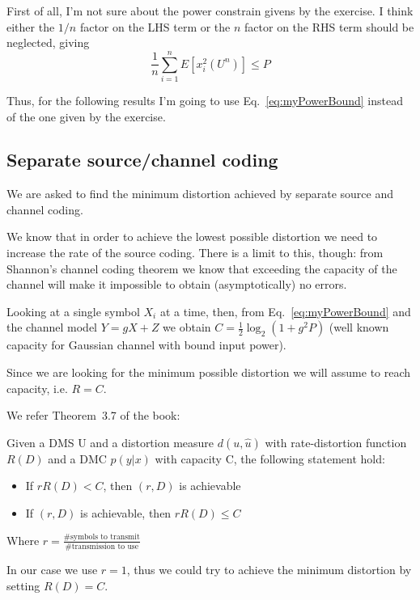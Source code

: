 
First of all, I'm not sure about the power constrain givens by the exercise. I think either the $1/n$ factor on the LHS term or the $n$ factor on the RHS term should be neglected, giving
%
\begin{equation}\label{eq:myPowerBound}
\frac{1}{n} \sum_{i=1}^n E[x_i^2(U^n)] \leq P
\end{equation}

Thus, for the following results I'm going to use Eq.~\eqref{eq:myPowerBound} instead of the one given by the exercise.

\subsection{Separate source/channel coding}
We are asked to find the minimum distortion achieved by separate source and channel coding.

We know that in order to achieve the lowest possible distortion we need to increase the rate of the source coding. There is a limit to this, though: from Shannon's channel coding theorem we know that exceeding the capacity of the channel will make it impossible to obtain (asymptotically) no errors.

Looking at a single symbol $X_i$ at a time, then, from Eq.~\eqref{eq:myPowerBound} and the channel model $Y=gX+Z$ we obtain $C= \frac{1}{2} \log_2(1+g^2P)$ (well known capacity for Gaussian channel with bound input power).

Since we are looking for the minimum possible distortion we will assume to reach capacity, i.e. $R=C$.

We refer Theorem~3.7 of the book:
%
\begin{theorem}
Given a DMS U and a distortion measure $d(u,\hat{u})$ with rate-distortion function $R(D)$ and a DMC $p(y|x)$ with capacity C, the following statement hold:
\begin{itemize}
	\item If $rR(D)<C$, then $(r,D)$ is achievable
	\item If $(r,D)$ is achievable, then $rR(D) \leq C$
\end{itemize}
Where $r=\frac{\mbox{\#symbols to transmit}}{\mbox{\#transmission to use}}$
\end{theorem}
In our case we use $r=1$, thus we could try to achieve the minimum distortion by setting $R(D)=C$.

